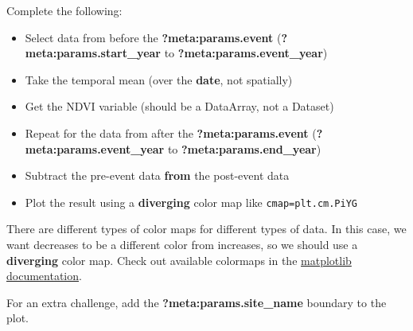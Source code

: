 \documentclass[
  letterpaper,
  DIV=11,
  numbers=noendperiod,
  oneside]{scrreprt}
\providecommand{\tightlist}{%
  \setlength{\itemsep}{0pt}\setlength{\parskip}{0pt}}
\begin{document}
\begin{tcolorbox}[enhanced jigsaw, colbacktitle=quarto-callout-color!10!white, opacityback=0, bottomtitle=1mm, toptitle=1mm, bottomrule=.15mm, left=2mm, colframe=quarto-callout-color-frame, leftrule=.75mm, opacitybacktitle=0.6, colback=white, rightrule=.15mm, toprule=.15mm, breakable, titlerule=0mm, title=\textcolor{quarto-callout-color}{\faInfo}\hspace{0.5em}{Try It: Plot the change in NDVI spatially}, coltitle=black, arc=.35mm]

Complete the following:

\begin{itemize}
\tightlist
\item
  Select data from before the \textbf{?meta:params.event}
  (\textbf{?meta:params.start\_year} to
  \textbf{?meta:params.event\_year})
\item
  Take the temporal mean (over the \textbf{date}, not spatially)
\item
  Get the NDVI variable (should be a DataArray, not a Dataset)
\item
  Repeat for the data from after the \textbf{?meta:params.event}
  (\textbf{?meta:params.event\_year} to \textbf{?meta:params.end\_year})
\item
  Subtract the pre-event data \textbf{from} the post-event data
\item
  Plot the result using a \textbf{diverging} color map like
  \texttt{cmap=plt.cm.PiYG}
\end{itemize}

There are different types of color maps for different types of data. In
this case, we want decreases to be a different color from increases, so
we should use a \textbf{diverging} color map. Check out available
colormaps in the
\href{https://matplotlib.org/stable/tutorials/colors/colormaps.html}{matplotlib
documentation}.

\end{tcolorbox}

\begin{tcolorbox}[enhanced jigsaw, colbacktitle=quarto-callout-color!10!white, opacityback=0, bottomtitle=1mm, toptitle=1mm, bottomrule=.15mm, left=2mm, colframe=quarto-callout-color-frame, leftrule=.75mm, opacitybacktitle=0.6, colback=white, rightrule=.15mm, toprule=.15mm, breakable, titlerule=0mm, title=\textcolor{quarto-callout-color}{\faInfo}\hspace{0.5em}{Looking for an Extra Challenge?}, coltitle=black, arc=.35mm]

For an extra challenge, add the \textbf{?meta:params.site\_name}
boundary to the plot.

\end{tcolorbox}
\end{document}
